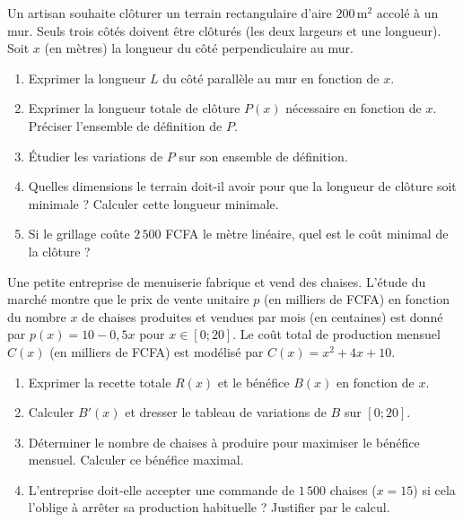\documentclass[11pt]{article}
\begin{document}
\begin{exercice}
Un artisan souhaite clôturer un terrain rectangulaire d'aire $200\,\text{m}^2$ accolé à un mur. Seuls trois côtés doivent être clôturés (les deux largeurs et une longueur). Soit $x$ (en mètres) la longueur du côté perpendiculaire au mur.
\begin{enumerate}
    \item Exprimer la longueur $L$ du côté parallèle au mur en fonction de $x$.
    \item Exprimer la longueur totale de clôture $P(x)$ nécessaire en fonction de $x$. Préciser l'ensemble de définition de $P$.
    \item Étudier les variations de $P$ sur son ensemble de définition.
    \item Quelles dimensions le terrain doit-il avoir pour que la longueur de clôture soit minimale ? Calculer cette longueur minimale.
    \item Si le grillage coûte $2\,500$ FCFA le mètre linéaire, quel est le coût minimal de la clôture ?
\end{enumerate}
\end{exercice}

\begin{exercice}
Une petite entreprise de menuiserie fabrique et vend des chaises. L'étude du marché montre que le prix de vente unitaire $p$ (en milliers de FCFA) en fonction du nombre $x$ de chaises produites et vendues par mois (en centaines) est donné par $p(x) = 10 - 0,5x$ pour $x \in [0; 20]$. Le coût total de production mensuel $C(x)$ (en milliers de FCFA) est modélisé par $C(x) = x^2 + 4x + 10$.
\begin{enumerate}
    \item Exprimer la recette totale $R(x)$ et le bénéfice $B(x)$ en fonction de $x$.
    \item Calculer $B'(x)$ et dresser le tableau de variations de $B$ sur $[0; 20]$.
    \item Déterminer le nombre de chaises à produire pour maximiser le bénéfice mensuel. Calculer ce bénéfice maximal.
    \item L'entreprise doit-elle accepter une commande de $1\,500$ chaises ($x=15$) si cela l'oblige à arrêter sa production habituelle ? Justifier par le calcul.
\end{enumerate}
\end{exercice}
\end{document}
